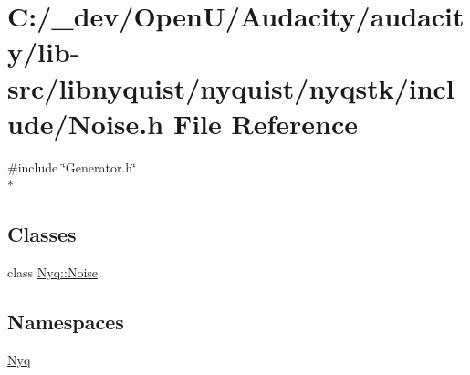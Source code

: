 \hypertarget{lib-src_2libnyquist_2nyquist_2nyqstk_2include_2_noise_8h}{}\section{C\+:/\+\_\+dev/\+Open\+U/\+Audacity/audacity/lib-\/src/libnyquist/nyquist/nyqstk/include/\+Noise.h File Reference}
\label{lib-src_2libnyquist_2nyquist_2nyqstk_2include_2_noise_8h}
{\ttfamily \#include \char`\"{}Generator.\+h\char`\"{}}\\*
\subsection*{Classes}
\begin{DoxyCompactItemize}
\item 
class \hyperlink{class_nyq_1_1_noise}{Nyq\+::\+Noise}
\end{DoxyCompactItemize}
\subsection*{Namespaces}
\begin{DoxyCompactItemize}
\item 
 \hyperlink{namespace_nyq}{Nyq}
\end{DoxyCompactItemize}
